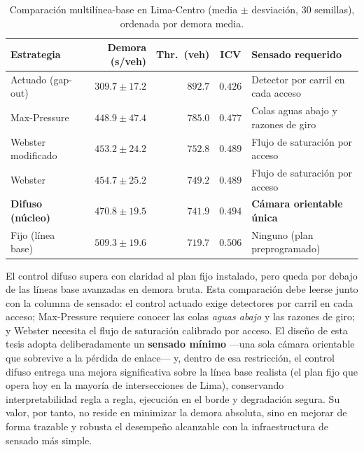 \begin{table}[H]
  \centering
  \footnotesize
  \caption{Comparación multilínea-base en Lima-Centro (media $\pm$ desviación, 30 semillas), ordenada por demora media.}
  \label{tab:resultados-multibaseline}
  \begin{tabularx}{\linewidth}{@{}l r r c >{\raggedright\arraybackslash}X@{}}
    \toprule
    \textbf{Estrategia} & \textbf{Demora (s/veh)} & \textbf{Thr.\ (veh)} & \textbf{ICV} & \textbf{Sensado requerido}\\
    \midrule
    Actuado (gap-out)        & $309.7 \pm 17.2$ & $892.7$ & $0.426$ & Detector por carril en cada acceso\\
    Max-Pressure             & $448.9 \pm 47.4$ & $785.0$ & $0.477$ & Colas aguas abajo y razones de giro\\
    Webster modificado       & $453.2 \pm 24.2$ & $752.8$ & $0.489$ & Flujo de saturación por acceso\\
    Webster                  & $454.7 \pm 25.2$ & $749.2$ & $0.489$ & Flujo de saturación por acceso\\
    \textbf{Difuso (núcleo)} & $470.8 \pm 19.5$ & $741.9$ & $0.494$ & \textbf{Cámara orientable única}\\
    Fijo (línea base)        & $509.3 \pm 19.6$ & $719.7$ & $0.506$ & Ninguno (plan preprogramado)\\
    \bottomrule
  \end{tabularx}
\end{table}

El control difuso supera con claridad al plan fijo instalado, pero queda por debajo de las líneas base
avanzadas en demora bruta. Esta comparación debe leerse junto con la columna de sensado: el control actuado
exige detectores por carril en cada acceso; Max-Pressure requiere conocer las colas \emph{aguas abajo} y las
razones de giro; y Webster necesita el flujo de saturación calibrado por acceso. El diseño de esta tesis
adopta deliberadamente un \textbf{sensado mínimo} —una sola cámara orientable que sobrevive a la pérdida de
enlace— y, dentro de esa restricción, el control difuso entrega una mejora significativa sobre la línea base
realista (el plan fijo que opera hoy en la mayoría de intersecciones de Lima), conservando interpretabilidad
regla a regla, ejecución en el borde y degradación segura. Su valor, por tanto, no reside en minimizar la
demora absoluta, sino en mejorar de forma trazable y robusta el desempeño alcanzable con la infraestructura de
sensado más simple.


